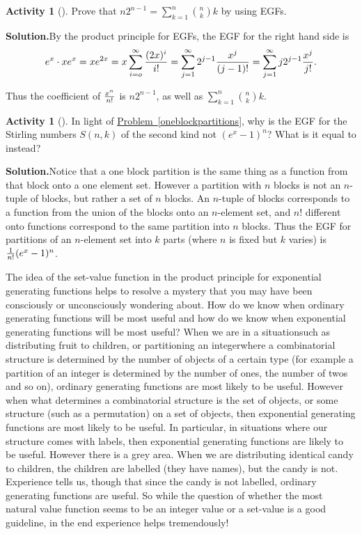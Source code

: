 \documentclass[10pt,]{book}
\theoremstyle{plain}
\theoremstyle{definition}
\newtheorem{activity}[project]{Activity}
\numberwithin{equation}{chapter}
\begin{document}
\begin{activity}[]\label{activity-107}
Prove that \(n2^{n-1} = \sum_{k=1}^n {n\choose k}k\) by using EGFs.%
\par\medskip\noindent%
\textbf{Solution.}\quad By the product principle for EGFs, the EGF for the right hand side is%
\begin{equation*}
e^x\cdot xe^x =xe^{2x}=x\sum_{i=o}^\infty {(2x)^i\over i!} =
\sum_{j=1}^\infty 2^{j-1}{x^j\over (j-1)!}=\sum_{j=1}^\infty
j2^{j-1}{x^j\over j!}.
\end{equation*}
%
\par
Thus the coefficient of \(x^n\over n!\) is \(n2^{n-1}\), as well as \(\sum_{k=1}^n {n\choose k}k\).%
\end{activity}
\begin{activity}[]\label{activity-108}
In light of \hyperref[oneblockpartitions]{Problem~\ref{oneblockpartitions}}, why is the EGF for the Stirling numbers \(S(n,k)\) of the second kind not \((e^x -1)^n\)? What is it equal to instead?%
\par\medskip\noindent%
\textbf{Solution.}\quad Notice that a one block partition is the same thing as a function from that block onto a one element set. However a partition with \(n\) blocks is not an \(n\)-tuple of blocks, but rather a set of \(n\) blocks. An \(n\)-tuple of blocks corresponds to a function from the union of the blocks onto an \(n\)-element set, and \(n!\) different onto functions correspond to the same partition into \(n\) blocks. Thus the EGF for partitions of an \(n\)-element set into \(k\) parts (where \(n\) is fixed but \(k\) varies) is \({1\over n!} (e^x -1)^n\).%
\end{activity}
The idea of the set-value function in the product principle for exponential generating functions helps to resolve a mystery that you may have been consciously or unconsciously wondering about. How do we know when ordinary generating functions will be most useful and how do we know when exponential generating functions will be most useful? When we are in a situation\textemdash{}such as distributing fruit to children, or partitioning an integer\textemdash{}where a combinatorial structure is determined by the number of objects of a certain type (for example a partition of an integer is determined by the number of ones, the number of twos and so on), ordinary generating functions are most likely to be useful. However when what determines a combinatorial structure is the set of objects, or some structure (such as a permutation) on a set of objects, then exponential generating functions are most likely to be useful. In particular, in situations where our structure comes with labels, then exponential generating functions are likely to be useful. However there is a grey area. When we are distributing identical candy to children, the children are labelled (they have names), but the candy is not. Experience tells us, though that since the candy is not labelled, ordinary generating functions are useful. So while the question of whether the most natural value function seems to be an integer value or a set-value is a good guideline, in the end experience helps tremendously!%
\typeout{************************************************}
\typeout{************************************************}
\end{document}
